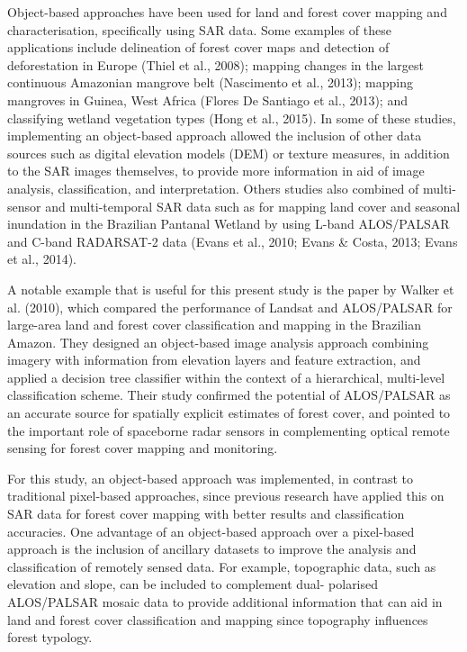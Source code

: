 Object-based approaches have been used for land and forest cover mapping and characterisation, specifically using SAR data. Some examples of these applications include delineation of forest cover maps and detection of deforestation in Europe (Thiel et al., 2008); mapping changes in the largest continuous Amazonian mangrove belt (Nascimento et al., 2013); mapping mangroves in Guinea, West Africa (Flores De Santiago et al., 2013); and classifying wetland vegetation types (Hong et al., 2015). In some of these studies, implementing an object-based approach allowed the inclusion of other data sources such as digital elevation models (DEM) or texture measures, in addition to the SAR images themselves, to provide more information in aid of image analysis, classification, and interpretation. Others studies also combined of multi-sensor and multi-temporal SAR data such as for mapping land cover and seasonal inundation in the Brazilian Pantanal Wetland by using L-band ALOS/PALSAR and C-band RADARSAT-2 data (Evans et al., 2010; Evans \& Costa, 2013; Evans et al., 2014).

A notable example that is useful for this present study is the paper by Walker et al. (2010), which compared the performance of Landsat and ALOS/PALSAR for large-area land and forest cover classification and mapping in the Brazilian Amazon. They designed an object-based image analysis approach combining imagery with information from elevation layers and feature extraction, and applied a decision tree classifier within the context of a hierarchical, multi-level classification scheme. Their study confirmed the potential of ALOS/PALSAR as an accurate source for spatially explicit estimates of forest cover, and pointed to the important role of spaceborne radar sensors in complementing optical remote sensing for forest cover mapping and monitoring.

For this study, an object-based approach was implemented, in contrast to traditional pixel-based approaches, since previous research have applied this on SAR data for forest cover mapping with better results and classification accuracies. One advantage of an object-based approach over a pixel-based approach is the inclusion of ancillary datasets to improve the analysis and classification of remotely sensed data. For example, topographic data, such as elevation and slope, can be included to complement dual- polarised ALOS/PALSAR mosaic data to provide additional information that can aid in land and forest cover classification and mapping since topography influences forest typology.

